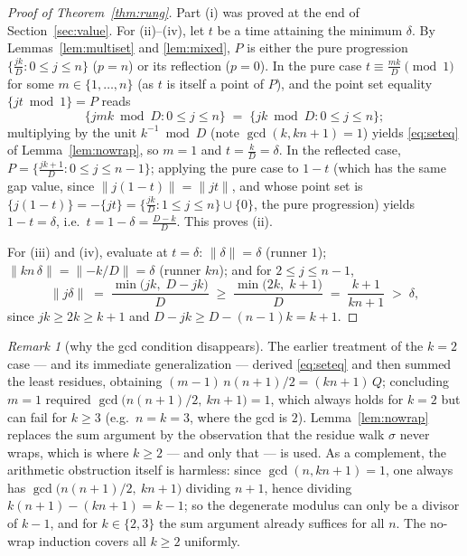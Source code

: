 \documentclass[11pt,a4paper]{article}
\theoremstyle{plain}
\theoremstyle{definition}
\theoremstyle{remark}
\newtheorem{remark}[theorem]{Remark}
\newcommand{\norm}[1]{\lVert #1 \rVert}
\begin{document}
\begin{proof}[Proof of Theorem~\ref{thm:rung}]
Part (i) was proved at the end of Section~\ref{sec:value}. For (ii)--(iv),
let $t$ be a time attaining the minimum $\delta$. By
Lemmas~\ref{lem:multiset} and \ref{lem:mixed}, $P$ is either the pure
progression $\{\tfrac{jk}{D} : 0 \le j \le n\}$ ($p = n$) or its reflection
($p = 0$). In the pure case $t \equiv \tfrac{mk}{D} \pmod 1$ for some
$m \in \{1, \dots, n\}$ (as $t$ is itself a point of $P$), and the point
set equality $\{jt \bmod 1\} = P$ reads
\[
  \{ jmk \bmod D : 0 \le j \le n \} \;=\; \{ jk \bmod D : 0 \le j \le n \};
\]
multiplying by the unit $k^{-1} \bmod D$ (note $\gcd(k, kn+1) = 1$) yields
\eqref{eq:seteq} of Lemma~\ref{lem:nowrap}, so $m = 1$ and $t =
\tfrac{k}{D} = \delta$. In the reflected case, $P = \{\tfrac{jk+1}{D} : 0
\le j \le n-1\}$; applying the pure case to $1 - t$ (which has the same gap
value, since $\norm{j(1-t)} = \norm{jt}$, and whose point set is
$\{j(1-t)\} = -\{jt\} = \{\tfrac{jk}{D} : 1 \le j \le n\} \cup \{0\}$, the
pure progression) yields $1 - t = \delta$, i.e.\ $t = 1 - \delta =
\tfrac{D-k}{D}$. This proves (ii).

For (iii) and (iv), evaluate at $t = \delta$: $\norm{\delta} = \delta$
(runner $1$); $\norm{kn\,\delta} = \norm{-k/D} = \delta$ (runner $kn$);
and for $2 \le j \le n-1$,
\[
  \norm{j\delta} \;=\; \frac{\min\bigl(jk,\; D - jk\bigr)}{D}
  \;\ge\; \frac{\min\bigl(2k,\; k+1\bigr)}{D}
  \;=\; \frac{k+1}{kn+1} \;>\; \delta,
\]
since $jk \ge 2k \ge k+1$ and $D - jk \ge D - (n-1)k = k+1$.
\end{proof}

\begin{remark}[why the gcd condition disappears]\label{rem:gcd}
The earlier treatment of the $k = 2$ case --- and its immediate
generalization --- derived \eqref{eq:seteq} and then summed the least
residues, obtaining $(m-1)\,n(n+1)/2 = (kn+1)\,Q$; concluding $m = 1$
required $\gcd\bigl(n(n+1)/2,\ kn+1\bigr) = 1$, which always holds for
$k = 2$ but can fail for $k \ge 3$ (e.g.\ $n = k = 3$, where the gcd is
$2$). Lemma~\ref{lem:nowrap} replaces the sum argument by the observation
that the residue walk $\sigma$ never wraps, which is where $k \ge 2$ --- and
only that --- is used. As a complement, the arithmetic obstruction itself is
harmless: since $\gcd(n, kn+1) = 1$, one always has
$\gcd\bigl(n(n+1)/2,\ kn+1\bigr)$ dividing $n+1$, hence dividing
$k(n+1) - (kn+1) = k - 1$; so the degenerate modulus can only be a divisor
of $k-1$, and for $k \in \{2,3\}$ the sum argument already suffices for all
$n$. The no-wrap induction covers all $k \ge 2$ uniformly.
\end{remark}
\end{document}

